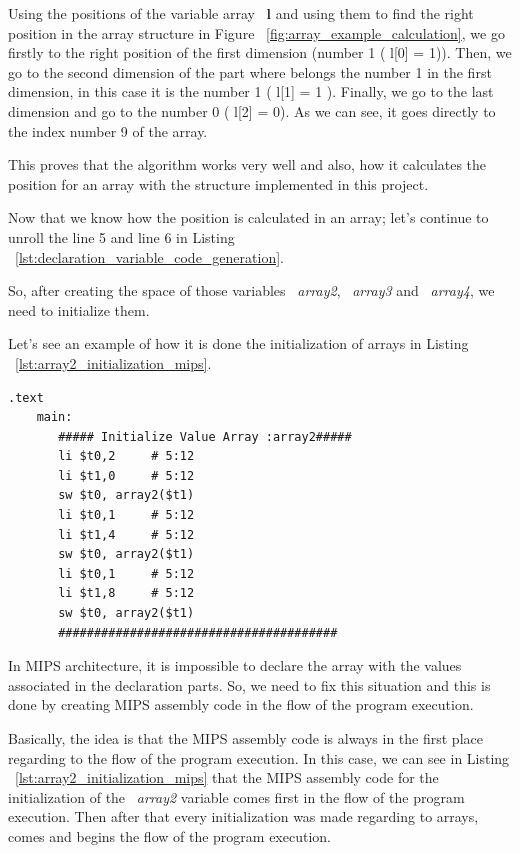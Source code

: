 \documentclass[
  oneside,
  11pt, a4paper,
  footinclude=true,
  headinclude=true,
  cleardoublepage=empty
]{scrbook}
\begin{document}
Using the positions of the variable array ~\textbf{l} and using them to find the right position in the array structure in Figure ~\ref{fig:array_example_calculation}, we go firstly to the right position of the first dimension (number 1 ( l[0] = 1)). Then, we go to the second dimension of the part where belongs the number 1 in the first dimension,  in this case it is the number 1 ( l[1] = 1 ). Finally, we go to the last dimension and go to the number 0 ( l[2] = 0).  As we can see, it goes directly to the index number 9 of the array. 

This proves that the algorithm works very well and also, how it calculates the position for an array with the structure implemented in this project.

Now that we know how the position is calculated in an array; let's continue to unroll the line 5 and line 6 in Listing ~\ref{lst:declaration_variable_code_generation}.

So, after creating the space of those variables ~\textit{array2}, ~\textit{array3} and ~\textit{array4}, we need to initialize them.

Let's see an example of how it is done the initialization of arrays in Listing ~\ref{lst:array2_initialization_mips}.

\begin{lstlisting}[caption={MIPS assembly code generated for the variable array2},label={lst:array2_initialization_mips}]
  .text
    main:
       ##### Initialize Value Array :array2#####
       li $t0,2		# 5:12
       li $t1,0		# 5:12
       sw $t0, array2($t1)		
       li $t0,1		# 5:12
       li $t1,4		# 5:12
       sw $t0, array2($t1)		
       li $t0,1		# 5:12
       li $t1,8		# 5:12
       sw $t0, array2($t1)		
       #######################################
\end{lstlisting}

In MIPS architecture, it is impossible to declare the array with the values associated in the declaration parts. So, we need to fix this situation and this is done by creating MIPS assembly code in the flow of the program execution.

Basically, the idea is that the MIPS assembly code is always in the first place regarding to the flow of the program execution. In this case, we can see in Listing ~\ref{lst:array2_initialization_mips} that the MIPS assembly code for the initialization of the ~\textit{array2} variable comes first in the flow of the program execution. Then after that every initialization was made regarding to arrays, comes and begins the flow of the program execution.
\end{document}

